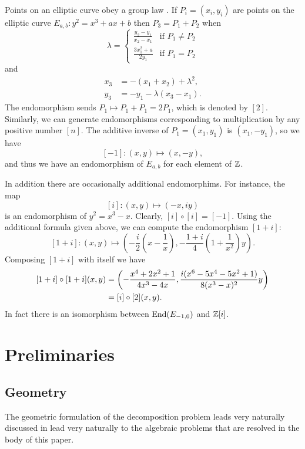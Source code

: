 Points on an elliptic curve obey a group law
\cite{Silverman2016-lo}.  If $P_i = (x_i, y_i)$ are points on
the elliptic curve $E_{a,b} : y^2 = x^3+ax+b$ then $P_3 = P_1 + P_2$
when
\[
\lambda = \left\{\begin{array}{ll}
  \displaystyle\frac{y_2 - y_1}{x_2 - x_1} & \mbox{if $P_1 \not= P_2$}\\
  \displaystyle\frac{3x_1^2+a}{2y_1} & \mbox{if $P_1 = P_2$}
 \end{array}\right.
\]
and
\[
\begin{aligned}
  x_3 & = - (x_1 + x_2) + \lambda^2, \\ 
  y_3 & = -y_1 - \lambda (x_3 - x_1).
\end{aligned}
\]
The endomorphism  sends
$P_1\mapsto P_1 + P_1 = 2P_1$, which is denoted by $[2]$.  Similarly,
we can generate endomorphisms corresponding to multiplication by any
positive number $[n]$.  The additive inverse of $P_1 = (x_1, y_1)$ is
$(x_1, - y_1)$, so we have 
\[
[-1] : (x, y) \mapsto (x, - y),
\]
and thus we have an endomorphism of $E_{a,b}$ for each element of
$\mathbb{Z}$.

In addition there are occasionally additional endomorphims.  For
instance, the map 
\[
[i] : (x, y) \mapsto (-x, iy)
\]
is an endomorphism of $y^2 = x^3 -x$.  Clearly, $[i] \circ [i] =
[-1]$.  Using the additional formula given above, we can compute the
endomorphism $[1+i]$:
\[
[1+i] : (x, y) \mapsto \left(-\frac{i}{2}\left(x - \frac{1}{x}\right),
  -\frac{1+i}{4}\left(1 + \frac{1}{x^2}\right) y\right).
\]
Composing $[1+i]$ with itself we have
\[
\begin{aligned}
\relax [1+i]\circ[1+i](x,y) & = \left(
-\frac{x^4+2x^2+1}{4x^3-4x}, \frac{i(x^6-5x^4-5x^2+1)}{8(x^3-x)^2}y\right)\\
& = [i] \circ [2] (x,y).
\end{aligned}
\]
In fact there is an isomorphism between $\mathop{\rm End}\nolimits(E_{-1,0})$ and $\mathbb{Z}[i]$.

\section{Preliminaries}
\label{Generalities:Sec}

\subsection{Geometry}
The geometric formulation of the decomposition problem leads very
naturally discussed in  lead very
naturally to the algebraic problems that are resolved in the body of
this paper. 

